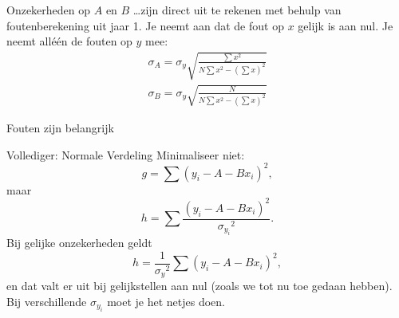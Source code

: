\documentclass{beamer}
\newcommand{\tsum}{\textstyle\sum}
\begin{document}
\begin{frame}{Onzekerheden op $A$ en $B$}
  \dots zijn direct uit te rekenen met behulp van foutenberekening uit jaar 1. Je neemt aan dat de fout op $x$ gelijk is aan nul. Je neemt alléén de fouten op $y$ mee:
  \begin{gather*}
    \sigma_A = \sigma_y\sqrt{\frac{\tsum x^2}{N\tsum x^2 - (\tsum x)^2}} \\[1em]
    \sigma_B = \sigma_y\sqrt{\frac{N}{N\tsum x^2 - (\tsum x)^2}}
  \end{gather*}
\end{frame}

\begin{frame}{Fouten zijn belangrijk}
  \begin{center}

  \end{center}
\end{frame}

\begin{frame}{Vollediger: Normale Verdeling}
  Minimaliseer \alert{niet}:
  \begin{equation*}
    g = \sum(y_i - A - Bx_i)^2,
  \end{equation*}
  maar
  \begin{equation*}
    h = \sum\frac{(y_i - A - Bx_i)^2}{{\sigma_{y_i}}^2}.
  \end{equation*}
  Bij gelijke onzekerheden geldt
  \begin{equation*}
    h = \frac{1}{{\sigma_y}^2}\sum(y_i - A - Bx_i)^2,
  \end{equation*}
  en dat valt er uit bij gelijkstellen aan nul (zoals we tot nu toe gedaan hebben). Bij verschillende $\sigma_{y_i}$ moet je het netjes doen.
\end{frame}
\end{document}
